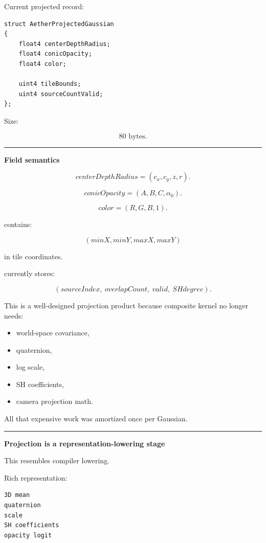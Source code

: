 Current projected record:

\protect{}\label{2lb4al}%
\begin{verbatim}
struct AetherProjectedGaussian
{
    float4 centerDepthRadius;
    float4 conicOpacity;
    float4 color;

    uint4 tileBounds;
    uint4 sourceCountValid;
};
\end{verbatim}

Size:

\[
\boxed{80\text{ bytes}.}
\]

\begin{center}\rule{0.5\linewidth}{0.5pt}\end{center}

\textbf{Field semantics}

\[
centerDepthRadius
=
(c_x,c_y,z,r).
\]

\[
conicOpacity
=
(A,B,C,\alpha_0).
\]

\[
color
=
(R,G,B,1).
\]

 contains:

\[
(minX,minY,maxX,maxY)
\]

in tile coordinates.

 currently stores:

\[
(sourceIndex,\ overlapCount,\ valid,\ SHdegree).
\]

This is a well-designed projection product because composite kernel no longer needs:

\begin{itemize}
\tightlist
\item
  world-space covariance,
\item
  quaternion,
\item
  log scale,
\item
  SH coefficients,
\item
  camera projection math.
\end{itemize}

All that expensive work was amortized once per Gaussian.

\begin{center}\rule{0.5\linewidth}{0.5pt}\end{center}

\textbf{Projection is a representation-lowering stage}

This resembles compiler lowering.

Rich representation:

\protect{}\label{jyhwui}%
\begin{verbatim}
3D mean
quaternion
scale
SH coefficients
opacity logit
\end{verbatim}

